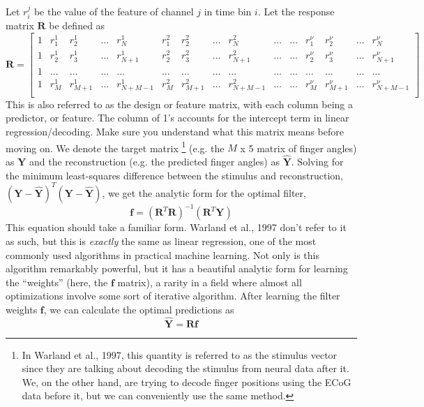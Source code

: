 \documentclass{article}
\begin{document}
Let $r_i^j$ be the value of the feature of channel $j$ in time bin $i$. Let the response matrix $\mathbf{R}$ be defined as
\[ \mathbf{R} = \left[\begin{array}{lllllllllllllll}1 & r_1^1 & r^1_2 & \ldots & r^1_N & r^2_1 & r_2^2 & \ldots & r^2_N & \ldots & \ldots & r^\nu_1 & r^\nu_2 & \ldots & r^\nu_N \\
1 & r_2^1 & r^1_3 & \ldots & r^1_{N+1} & r^2_2 & r_3^2 & \ldots & r^2_{N+1} & \ldots & \ldots & r^\nu_2 & r^\nu_3 & \ldots & r^\nu_{N+1} \\
1 & \ldots & \ldots & \ldots & \ldots & \ldots & \ldots & \ldots & \ldots & \ldots & \ldots & \ldots & \ldots & \ldots & \ldots \\
1 & r_{M}^1 & r^1_{M+1} & \ldots & r^1_{N+M-1} & r^2_{M} & r_{M+1}^2 & \ldots & r^2_{N+M-1} & \ldots & \ldots & r^\nu_{M} & r^\nu_{M+1} & \ldots & r^\nu_{N+M-1} \\\end{array}\right]
\]
This is also referred to as the design or feature matrix, with each column being a predictor, or feature. The column of 1's accounts for the intercept term in linear regression/decoding. Make sure you understand what this matrix means before moving on.
We denote the target matrix \footnote{In Warland et al., 1997, this quantity is referred to as the stimulus vector since they are talking about decoding the stimulus from neural data after it. We, on the other hand, are trying to decode finger positions using the ECoG data before it, but we can conveniently use the same method.} (e.g. the $M$ x 5 matrix of finger angles) as $\mathbf{Y}$ and the reconstruction (e.g. the predicted finger angles) as $\mathbf{\hat{Y}}$. Solving for the minimum least-squares difference between the stimulus and reconstruction, $(\mathbf{Y}-\mathbf{\hat{Y}})^T(\mathbf{Y}-\mathbf{\hat{Y}})$, we get the analytic form for the optimal filter,
\begin{equation} \mathbf{f} = (\mathbf{R}^T\mathbf{R})^{-1}(\mathbf{R}^T\mathbf{Y}) \end{equation}
This equation should take a familiar form. Warland et al., 1997 don't refer to it as such, but this is \emph{exactly} the same as linear regression, one of the most commonly used algorithms in practical machine learning. Not only is this algorithm remarkably powerful, but it has a beautiful analytic form for learning the ``weights'' (here, the $\mathbf{f}$ matrix), a rarity in a field where almost all optimizations involve some sort of iterative algorithm.
After learning the filter weights $\mathbf{f}$, we can calculate the optimal predictions as
\begin{equation} \mathbf{\hat{Y}} = \mathbf{R}\mathbf{f}
\end{equation}
\end{document}
